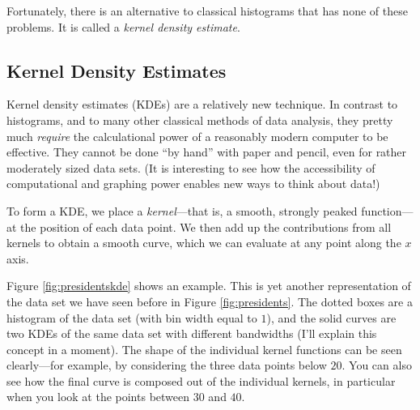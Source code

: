 Fortunately, there is an alternative to classical histograms that has
none of these problems. It is called a \emph{kernel density estimate}.


\subsection{Kernel Density Estimates}


Kernel density estimates (KDEs) are a relatively new technique. In
contrast to histograms, and to many other classical methods of data
analysis, they pretty much \emph{require} the calculational power of a
reasonably modern computer to be effective. They cannot be done ``by
hand'' with paper and pencil, even for rather moderately sized data
sets. (It is interesting to see how the accessibility of computational
and graphing power enables new ways to think about data!)

To form a KDE, we place a \emph{kernel}---that is, a smooth, strongly
peaked function---at the position of each data point. We then add up
the contributions from all kernels to obtain a smooth curve, which we
can evaluate at any point along the $x$ axis.

Figure \ref{fig:presidentskde} shows an example. This is yet another
representation of the data set we have seen before in Figure
\ref{fig:presidents}. The dotted boxes are a histogram of the data
set (with bin width equal to $1$), and the solid curves are two KDEs
of the same data set with different bandwidths (I'll explain this
concept in a moment).  The shape of the individual kernel functions can
be seen clearly---for example, by considering the three data points
below $20$. You can also see how the final curve is composed out of
the individual kernels, in particular when you look at the points
between $30$ and $40$.

